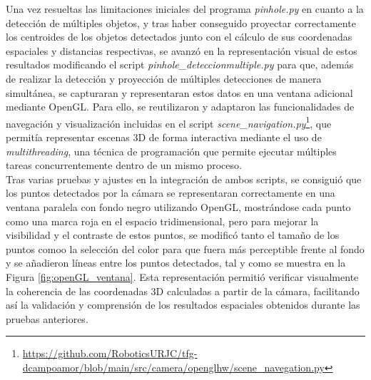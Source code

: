Una vez resueltas las limitaciones iniciales del programa \textit{pinhole.py} en cuanto a la detección de múltiples objetos, y tras haber conseguido proyectar correctamente los centroides de los objetos detectados junto con el cálculo de sus coordenadas espaciales y distancias respectivas, se avanzó en la representación visual de estos resultados modificando el script \textit{pinhole\_deteccionmultiple.py} para que, además de realizar la detección y proyección de múltiples detecciones de manera simultánea, se capturaran y representaran estos datos en una ventana adicional mediante OpenGL. Para ello, se reutilizaron y adaptaron las funcionalidades de navegación y visualización incluidas en el script \textit{scene\_navigation.py}\footnote{\url{https://github.com/RoboticsURJC/tfg-dcampoamor/blob/main/src/camera/openglhw/scene_navegation.py}}, que permitía representar escenas 3D de forma interactiva mediante el uso de \textit{multithreading}, una técnica de programación que permite ejecutar múltiples tareas concurrentemente dentro de un mismo proceso.\\ 

Tras varias pruebas y ajustes en la integración de ambos scripts, se consiguió que los puntos detectados por la cámara se representaran correctamente en una ventana paralela con fondo negro utilizando OpenGL, mostrándose cada punto como una marca roja en el espacio tridimensional, pero para mejorar la visibilidad y el contraste de estos puntos, se modificó tanto el tamaño de los puntos comoo la selección del color para que fuera más perceptible frente al fondo y se añadieron líneas entre los puntos detectados, tal y como se muestra en la Figura \ref{fig:openGL_ventana}. Esta representación permitió verificar visualmente la coherencia de las coordenadas 3D calculadas a partir de la cámara, facilitando así la validación y comprensión de los resultados espaciales obtenidos durante las pruebas anteriores.

